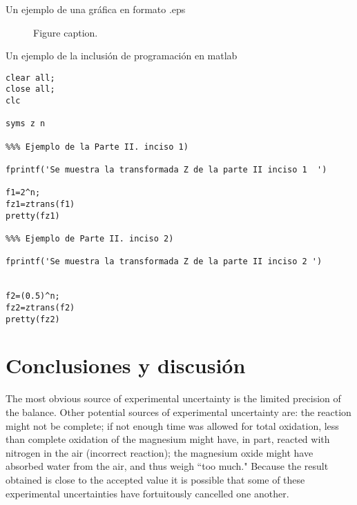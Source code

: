 \documentclass[11pt,letterpaper]{article}
\begin{document}
Un ejemplo de una gr\'afica en formato .eps 

\begin{figure}[h]
\begin{center}
\caption{Figure caption.}
\end{center}
\end{figure}


\bigskip

Un ejemplo de la inclusi\'on de programaci\'on en matlab

\begin{lstlisting}
clear all;
close all;
clc

syms z n

%%% Ejemplo de la Parte II. inciso 1)

fprintf('Se muestra la transformada Z de la parte II inciso 1  ')

f1=2^n;
fz1=ztrans(f1)
pretty(fz1)

%%% Ejemplo de Parte II. inciso 2)

fprintf('Se muestra la transformada Z de la parte II inciso 2 ')


f2=(0.5)^n;
fz2=ztrans(f2)
pretty(fz2)
\end{lstlisting}


\section{Conclusiones y discusi\'on}


The most obvious source of experimental uncertainty is the limited precision of the balance. Other potential sources of experimental uncertainty are: the reaction might not be complete; if not enough time was allowed for total oxidation, less than complete oxidation of the magnesium might have, in part, reacted with nitrogen in the air (incorrect reaction); the magnesium oxide might have absorbed water from the air, and thus weigh ``too much." Because the result obtained is close to the accepted value it is possible that some of these experimental uncertainties have fortuitously cancelled one another.







\end{document}
